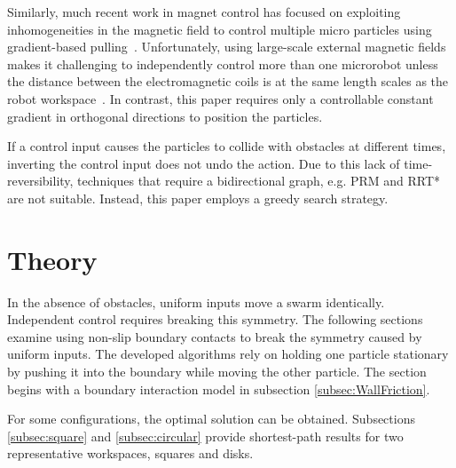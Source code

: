Similarly, much recent work in magnet control has focused on exploiting inhomogeneities in the magnetic field to control multiple micro particles  using gradient-based pulling~\cite{Salmanipour2018EightDOF,Denasi2018independent}.  
Unfortunately, using large-scale external magnetic fields makes it challenging to independently control more than one microrobot unless the  distance between the electromagnetic coils is at the same length scales as the robot workspace~\cite{diller2016six, Denasi2018independent, Salmanipour2018EightDOF}. In contrast, %
 this paper requires only a controllable constant gradient in orthogonal directions to position the particles.


If a control input causes the particles to collide with obstacles at different times, inverting the control input does not undo the action. 
 Due to this lack of time-reversibility, techniques that require a bidirectional graph, e.g. PRM \cite{kavraki1996probabilistic} and RRT* \cite{lavalle2006planning} are not suitable.
  Instead, this paper employs a greedy search strategy. 

\section{Theory}
\label{sec:theory}
 In the absence of obstacles, uniform inputs move a swarm identically.  
 Independent control requires breaking this symmetry. 
The following sections examine using non-slip boundary contacts to break the symmetry caused by uniform inputs.  
 The developed algorithms rely on holding one particle stationary by pushing it into the boundary while moving the other particle. 
 The section begins with a boundary interaction model in subsection \ref{subsec:WallFriction}.
 

For some configurations, the optimal solution can be obtained. 
Subsections \ref{subsec:square} and \ref{subsec:circular} provide shortest-path results for two representative workspaces, squares and disks.
